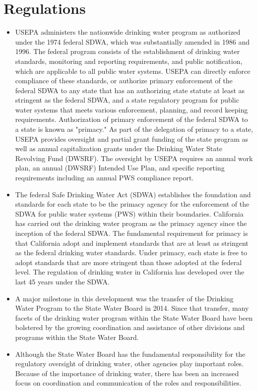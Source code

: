 \section{Regulations}
\begin{itemize}
\item USEPA administers the nationwide drinking water program as authorized under the 1974 federal SDWA, which was substantially amended in 1986 and 1996. The federal program consists of the establishment of drinking water standards, monitoring and reporting requirements, and public notification, which are applicable to all public water systems.
USEPA can directly enforce compliance of these standards, or authorize primary enforcement of the federal SDWA to any state that has an authorizing state statute at least as stringent as the federal SDWA, and a state regulatory program for public water systems that meets various enforcement, planning, and record keeping requirements.
Authorization of primary enforcement of the federal SDWA to a state is known as "primacy." As part of the delegation of primacy to a state, USEPA provides oversight and partial grant funding of the state program as well as annual capitalization grants under the Drinking Water State Revolving Fund (DWSRF). The oversight by USEPA requires an annual work plan, an annual (DWSRF) Intended Use Plan, and specific reporting requirements including an annual PWS compliance report.
\item The federal Safe Drinking Water Act (SDWA) establishes the foundation and standards for each state to be the primacy agency for the enforcement of the SDWA for public water systems (PWS) within their boundaries. California has carried out the drinking water program as the primacy agency since the inception of the federal SDWA. The fundamental requirement for primacy is that California adopt and implement standards that are at least as stringent as the federal drinking water standards. Under primacy, each state is free to adopt standards that are more stringent than those adopted at the federal level.
The regulation of drinking water in California has developed over the last 45 years under the SDWA. 
\item A major milestone in this development was the transfer of the Drinking Water Program to the State Water Board in 2014. Since that transfer, many facets of the drinking water program within the State Water Board have been bolstered by the growing coordination and assistance of other divisions and programs within the State Water Board. \item Although the State Water Board has the fundamental responsibility for the regulatory oversight of drinking water, other agencies play important roles. Because of the importance of drinking water, there has been an increased focus on coordination and communication of the roles and responsibilities.

\end{itemize}
